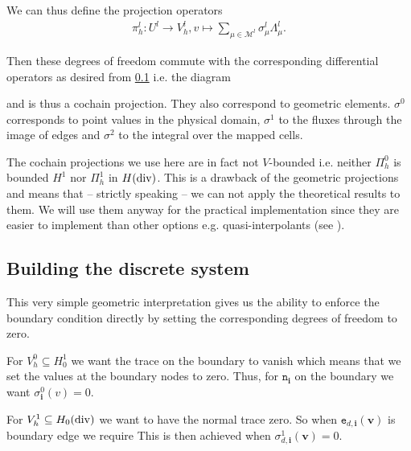\documentclass[../master_thesis.tex]{subfiles}
\begin{document}
We can thus define the projection operators 
\begin{align*}
    \pi_h^l: U^l \rightarrow V_h^l, v \mapsto \sum_{\mu \in \mathcal{M}^l} \sigma^l_\mu \Lambda^l_\mu.
\end{align*}

Then these degrees of freedom commute with the corresponding differential operators 
as desired from \ref{} i.e. the diagram


and is thus a cochain projection. 
They also correspond to geometric elements. 
$\sigma^0$ corresponds to point values in the physical domain, 
$\sigma^1$ to the fluxes through the image of edges and 
$\sigma^2$ to the integral over the mapped cells.

\begin{remark}
    The cochain projections we use here are in fact not $V$-bounded i.e. 
    neither $\Pi_h^0$ is bounded $H^1$ nor $\Pi_h^1$ in $H(\operatorname{div})$. 
    This is a drawback of the geometric projections and means that -- 
    strictly speaking -- we can not apply the theoretical results to them. 
    We will use them anyway for the practical implementation 
    since they are easier to implement than other 
    options e.g. quasi-interpolants (see \cite{} ).
\end{remark}

\subsection{Building the discrete system}

This very simple geometric interpretation gives us the ability to enforce 
the boundary condition directly by setting the corresponding degrees of freedom 
to zero. 

For $V_h^0 \subseteq H^1_0$ we want the trace on the boundary to vanish which 
means that we set the values at the boundary nodes to zero. Thus, 
for $\mathtt{n}_\mathbf{i}$ on the boundary we want 
$\sigma^0_{\mathbf{i}}(v) = 0$. 

For $V_h^1 \subseteq H_0(\operatorname{div})$ we want to have the normal trace zero. 
So when $\mathtt{e}_{d,\mathbf{i}}(\mathbf{v})$ is boundary edge we require
This is then achieved when $\sigma^1_{d,\mathbf{i}} (\mathbf{v}) = 0$.
\end{document}
